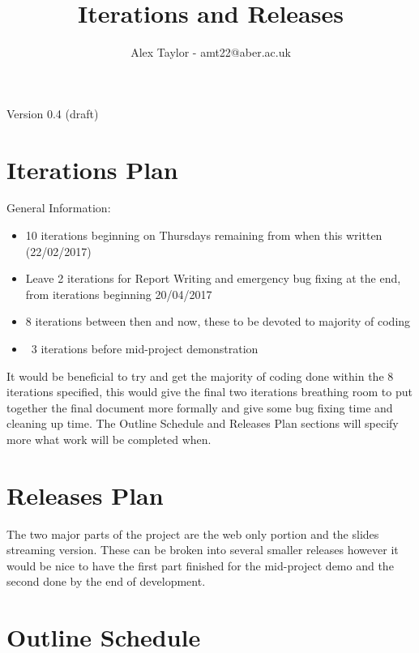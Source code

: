 \documentclass{article}
\title{Iterations and Releases}
\author{Alex Taylor - amt22@aber.ac.uk}
\begin{document}
\maketitle
\begin{center}
	Version 0.4 (draft)
\end{center}
\tableofcontents
\thispagestyle{empty}
\newpage

\section{Iterations Plan}
General Information:
\begin{itemize}
	\item 10 iterations beginning on Thursdays remaining from when this written (22/02/2017)
	\item Leave 2 iterations for Report Writing and emergency bug fixing at the end, from iterations beginning 20/04/2017
	\item 8 iterations between then and now, these to be devoted to majority of coding
	\item ~3 iterations before mid-project demonstration
\end{itemize}
It would be beneficial to try and get the majority of coding done within the 8 iterations specified, this would give the final two iterations breathing room to put together the final document more formally and give some bug fixing time and cleaning up time. The Outline Schedule and Releases Plan sections will specify more what work will be completed when.
\newpage

\section{Releases Plan}
The two major parts of the project are the web only portion and the slides streaming version. These can be broken into several smaller releases however it would be nice to have the first part finished for the mid-project demo and the second done by the end of development.
\newpage

\section{Outline Schedule}
\newpage
\end{document}
